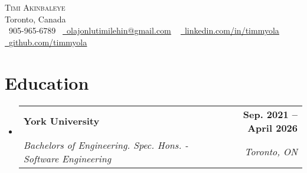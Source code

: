 \documentclass[letterpaper,11pt]{article}
\makeatletter
\newcommand{\resumeSubheading}[4]{
  \vspace{-2pt}\item
    \begin{tabular*}{1.0\textwidth}[t]{l@{\extracolsep{\fill}}r}
      \textbf{#1} & \textbf{\small #2} \\
      \textit{\small#3} & \textit{\small #4} \\
    \end{tabular*}\vspace{-7pt}
}
\newcommand{\resumeSubHeadingListStart}{\begin{itemize}[leftmargin=0.0in, label={}]}
\newcommand{\resumeSubHeadingListEnd}{\end{itemize}}
\makeatother
\begin{document}

\begin{center}
    {\Huge \scshape Timi Akinbaleye} \\ \vspace{1pt}
    Toronto, Canada \\ \vspace{1pt}
    \small \raisebox{-0.1\height}\faPhone\ 905-965-6789~ \href{mailto:olajonlutimilehin@gmail.com}{\raisebox{-0.2\height}\faEnvelope\  \underline{olajonlutimilehin@gmail.com}} ~ 
    \href{https://www.linkedin.com/in/timmyola/}{\raisebox{-0.2\height}\faLinkedin\ \underline{linkedin.com/in/timmyola}}  ~
    \href{https://github.com/timmyola}{\raisebox{-0.2\height}\faGithub\ \underline{github.com/timmyola}}
    \vspace{-8pt}
\end{center}


\section{Education}
  \resumeSubHeadingListStart
    \resumeSubheading
      {York University}{Sep. 2021 -- April 2026}
      {Bachelors of Engineering. Spec. Hons. - Software Engineering}{Toronto, ON}
  \resumeSubHeadingListEnd

\end{document}
